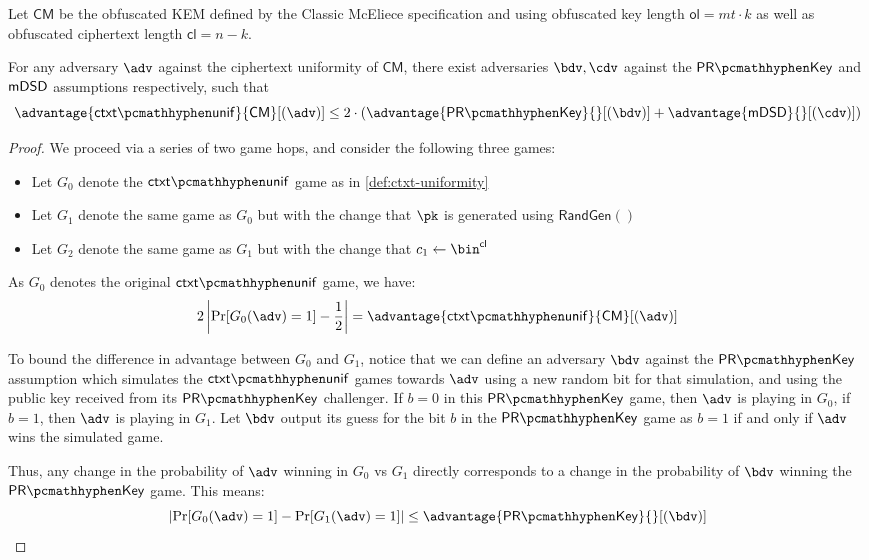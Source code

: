 \begin{lemma} \label{lem:classic-mceliece-ctxt-unif}
    Let $\textsf{CM}$ be the obfuscated KEM defined by the Classic McEliece specification \cite{NISTPQC-R4:ClassicMcEliece22} and using obfuscated key length $\textsf{ol} = mt \cdot k$ as well as obfuscated ciphertext length $\textsf{cl} = n-k$.
    
    For any adversary $\adv$ against the ciphertext uniformity of $\textsf{CM}$, there exist adversaries $\bdv, \cdv$ against the $\prkey$ and $\mathsf{mDSD}$ assumptions respectively, such that
    \[ \advantage{\ctxtunif}{\textsf{CM}}[(\adv)] \leq 2 \cdot \left( \advantage{\prkey}{}[(\bdv)] + \advantage{\mdsd}{}[(\cdv)] \right) \]
\end{lemma}
\begin{proof}
    We proceed via a series of two game hops, and consider the following three games:
    \begin{itemize}
        \item Let $G_0$ denote the $\ctxtunif$ game as in \cref{def:ctxt-uniformity}
        \item Let $G_1$ denote the same game as $G_0$ but with the change that $\pk$ is generated using $\textsf{RandGen}()$
        \item Let $G_2$ denote the same game as $G_1$ but with the change that $c_1 \gets \bin^\textsf{cl}$
    \end{itemize}

    As $G_0$ denotes the original $\ctxtunif$ game, we have:
    \[ 2 \left| \Pr[G_0(\adv) = 1] - \frac{1}{2} \right| = \advantage{\ctxtunif}{\textsf{CM}}[(\adv)] \]

    To bound the difference in advantage between $G_0$ and $G_1$, notice that we can define an adversary $\bdv$ against the $\prkey$ assumption which simulates the $\ctxtunif$ games towards $\adv$ using a new random bit for that simulation, and using the public key received from its $\prkey$ challenger. If $b=0$ in this $\prkey$ game, then $\adv$ is playing in $G_0$, if $b=1$, then $\adv$ is playing in $G_1$. Let $\bdv$ output its guess for the bit $b$ in the $\prkey$ game as $b=1$ if and only if $\adv$ wins the simulated game.

    Thus, any change in the probability of $\adv$ winning in $G_0$ vs $G_1$ directly corresponds to a change in the probability of $\bdv$ winning the $\prkey$ game. This means:
    \[ \left| \Pr[G_0(\adv) = 1] - \Pr[G_1(\adv) = 1] \right| \leq \advantage{\prkey}{}[(\bdv)] \]


\end{proof}
